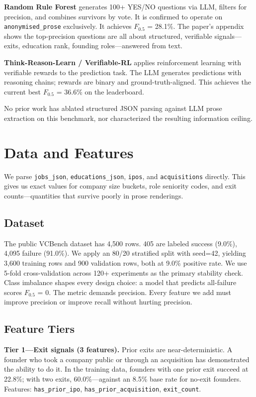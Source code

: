 \documentclass[10pt, conference]{IEEEtran}
\begin{document}
\textbf{Random Rule Forest} \cite{rrf} generates 100+ YES/NO questions via LLM, filters for precision, and combines survivors by vote. It is confirmed to operate on \texttt{anonymised\_prose} exclusively. It achieves $F_{0.5}$ = 28.1\%. The paper's appendix shows the top-precision questions are all about structured, verifiable signals---exits, education rank, founding roles---answered from text.

\textbf{Think-Reason-Learn / Verifiable-RL} \cite{trl} applies reinforcement learning with verifiable rewards to the prediction task. The LLM generates predictions with reasoning chains; rewards are binary and ground-truth-aligned. This achieves the current best $F_{0.5}$ = 36.6\% on the leaderboard.

No prior work has ablated structured JSON parsing against LLM prose extraction on this benchmark, nor characterized the resulting information ceiling.

\section{Data and Features}

We parse \texttt{jobs\_json}, \texttt{educations\_json}, \texttt{ipos}, and \texttt{acquisitions} directly. This gives us exact values for company size buckets, role seniority codes, and exit counts---quantities that survive poorly in prose renderings.

\subsection{Dataset}

The public VCBench dataset has 4,500 rows. 405 are labeled success (9.0\%), 4,095 failure (91.0\%). We apply an 80/20 stratified split with seed=42, yielding 3,600 training rows and 900 validation rows, both at 9.0\% positive rate. We use 5-fold cross-validation across 120+ experiments as the primary stability check. Class imbalance shapes every design choice: a model that predicts all-failure scores $F_{0.5}$ = 0. The metric demands precision. Every feature we add must improve precision or improve recall without hurting precision.

\subsection{Feature Tiers}

\textbf{Tier 1---Exit signals (3 features).} Prior exits are near-deterministic. A founder who took a company public or through an acquisition has demonstrated the ability to do it. In the training data, founders with one prior exit succeed at 22.8\%; with two exits, 60.0\%---against an 8.5\% base rate for no-exit founders. Features: \texttt{has\_prior\_ipo}, \texttt{has\_prior\_acquisition}, \texttt{exit\_count}.
\end{document}
